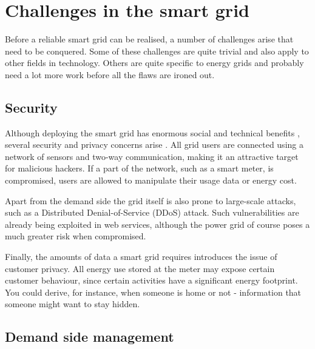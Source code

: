 \section{Challenges in the smart grid}   
Before a reliable smart grid can be realised, a number of challenges arise that need to be conquered. Some of these challenges are quite trivial and also apply to other fields in technology. Others are quite specific to energy grids and probably need a lot more work before all the flaws are ironed out.
 
 
\subsection{Security}
Although deploying the smart grid has enormous social and technical benefits , several security and privacy concerns arise \cite{McDanielMcLaughlin2009a}. All grid users are connected using a network of sensors and two-way communication, making it an attractive target for malicious hackers. If a part of the network, such as a smart meter, is compromised, users are allowed to manipulate their usage data or energy cost. 

Apart from the demand side the grid itself is also prone to large-scale attacks, such as a Distributed Denial-of-Service (DDoS) attack. Such vulnerabilities are already being exploited in web services, although the power grid of course poses a much greater risk when compromised.

Finally, the amounts of data a smart grid requires introduces the issue of customer privacy. All energy use stored at the meter may expose certain customer behaviour, since certain activities have a significant energy footprint. You could derive, for instance, when someone is home or not - information that someone might want to stay hidden.


\subsection{Demand side management}

